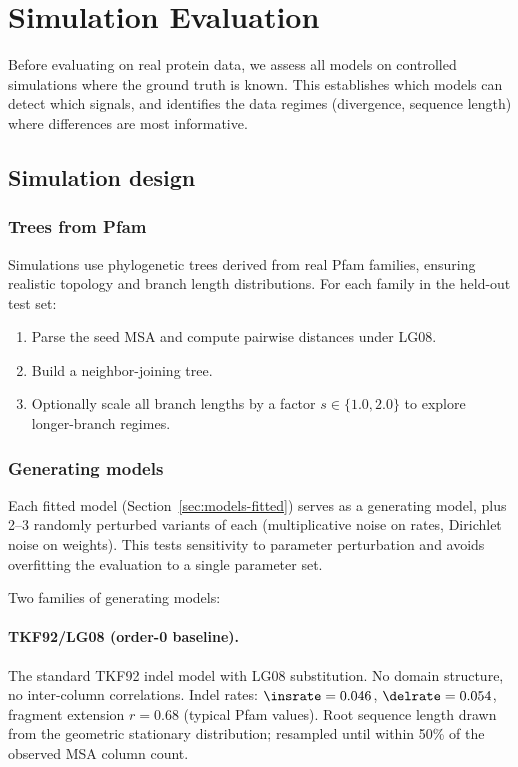 \section{Simulation Evaluation}
\label{sec:sim-eval}

Before evaluating on real protein data, we assess all models on
controlled simulations where the ground truth is known.
This establishes which models can detect which signals, and
identifies the data regimes (divergence, sequence length)
where differences are most informative.

\subsection{Simulation design}

\subsubsection{Trees from Pfam}

Simulations use phylogenetic trees derived from real Pfam families,
ensuring realistic topology and branch length distributions.
For each family in the held-out test set:
\begin{enumerate}
\item Parse the seed MSA and compute pairwise distances under LG08.
\item Build a neighbor-joining tree.
\item Optionally scale all branch lengths by a factor
  $s \in \{1.0, 2.0\}$ to explore longer-branch regimes.
\end{enumerate}

\subsubsection{Generating models}

Each fitted model (Section~\ref{sec:models-fitted}) serves as a
generating model, plus 2--3 randomly perturbed variants of each
(multiplicative noise on rates, Dirichlet noise on weights).
This tests sensitivity to parameter perturbation and avoids
overfitting the evaluation to a single parameter set.

Two families of generating models:

\paragraph{TKF92/LG08 (order-0 baseline).}
The standard TKF92 indel model with LG08 substitution.
No domain structure, no inter-column correlations.
Indel rates: $\insrate = 0.046$, $\delrate = 0.054$,
fragment extension $r = 0.68$ (typical Pfam values).
Root sequence length drawn from the geometric stationary distribution;
resampled until within 50\% of the observed MSA column count.

